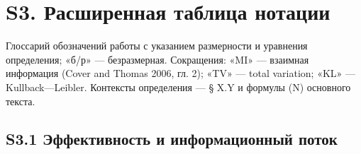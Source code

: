 \documentclass[pdflatex,sn-mathphys-ay]{sn-jnl}
\begin{document}
\section*{S3. Расширенная таблица нотации}\label{s3.-ux440ux430ux441ux448ux438ux440ux435ux43dux43dux430ux44f-ux442ux430ux431ux43bux438ux446ux430-ux43dux43eux442ux430ux446ux438ux438}



Глоссарий обозначений работы с указанием размерности и уравнения определения; «б/р» --- безразмерная. Сокращения: «MI» --- взаимная информация (Cover and Thomas 2006, гл. 2); «TV» --- total variation; «KL» --- Kullback---Leibler. Контексты определения --- § X.Y и формулы (N) основного текста.



\subsection*{S3.1 Эффективность и информационный поток}\label{s3.1-ux44dux444ux444ux435ux43aux442ux438ux432ux43dux43eux441ux442ux44c-ux438-ux438ux43dux444ux43eux440ux43cux430ux446ux438ux43eux43dux43dux44bux439-ux43fux43eux442ux43eux43a}
\end{document}

